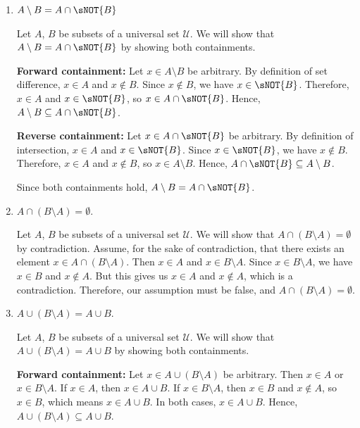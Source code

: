 \begin{enumerate}
\begin{enumerate}
    \item $A \setminus B = A \cap \sNOT{B}$
    \begin{subprove}
      Let $A$, $B$ be subsets of a universal set $\mathcal{U}$.
      We will show that $A \setminus B = A \cap \sNOT{B}$ by showing both containments.
      
      \textbf{Forward containment:} Let $x \in A \setminus B$ be arbitrary.
      By definition of set difference, $x \in A$ and $x \notin B$.
      Since $x \notin B$, we have $x \in \sNOT{B}$.
      Therefore, $x \in A$ and $x \in \sNOT{B}$, so $x \in A \cap \sNOT{B}$.
      Hence, $A \setminus B \subseteq A \cap \sNOT{B}$.
      
      \textbf{Reverse containment:} Let $x \in A \cap \sNOT{B}$ be arbitrary.
      By definition of intersection, $x \in A$ and $x \in \sNOT{B}$.
      Since $x \in \sNOT{B}$, we have $x \notin B$.
      Therefore, $x \in A$ and $x \notin B$, so $x \in A \setminus B$.
      Hence, $A \cap \sNOT{B} \subseteq A \setminus B$.
      
      Since both containments hold, $A \setminus B = A \cap \sNOT{B}$.
    \end{subprove}
    
    \item $A \cap (B \setminus A) = \emptyset$.
    \begin{subprove}
      Let $A$, $B$ be subsets of a universal set $\mathcal{U}$.
      We will show that $A \cap (B \setminus A) = \emptyset$ by contradiction.
      Assume, for the sake of contradiction, that there exists an element $x \in A \cap (B \setminus A)$.
      Then $x \in A$ and $x \in B \setminus A$.
      Since $x \in B \setminus A$, we have $x \in B$ and $x \notin A$.
      But this gives us $x \in A$ and $x \notin A$, which is a contradiction.
      Therefore, our assumption must be false, and $A \cap (B \setminus A) = \emptyset$.
    \end{subprove}
    
    \item $A \cup (B \setminus A) = A \cup B$.
    \begin{subprove}
      Let $A$, $B$ be subsets of a universal set $\mathcal{U}$.
      We will show that $A \cup (B \setminus A) = A \cup B$ by showing both containments.
      
      \textbf{Forward containment:} Let $x \in A \cup (B \setminus A)$ be arbitrary.
      Then $x \in A$ or $x \in B \setminus A$.
      If $x \in A$, then $x \in A \cup B$.
      If $x \in B \setminus A$, then $x \in B$ and $x \notin A$, so $x \in B$, which means $x \in A \cup B$.
      In both cases, $x \in A \cup B$. Hence, $A \cup (B \setminus A) \subseteq A \cup B$.
      

\end{subprove}
\end{enumerate}
\end{enumerate}
